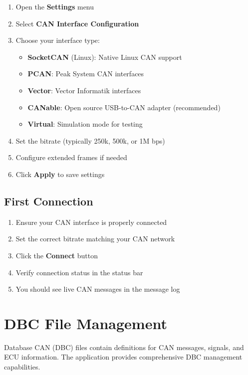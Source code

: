 \documentclass[11pt,a4paper]{article}
\begin{document}
\begin{enumerate}
    \item Open the \textbf{Settings} menu
    \item Select \textbf{CAN Interface Configuration}
    \item Choose your interface type:
    \begin{itemize}
        \item \textbf{SocketCAN} (Linux): Native Linux CAN support
        \item \textbf{PCAN}: Peak System CAN interfaces
        \item \textbf{Vector}: Vector Informatik interfaces
        \item \textbf{CANable}: Open source USB-to-CAN adapter (recommended)
        \item \textbf{Virtual}: Simulation mode for testing
    \end{itemize}
    \item Set the bitrate (typically 250k, 500k, or 1M bps)
    \item Configure extended frames if needed
    \item Click \textbf{Apply} to save settings
\end{enumerate}

\subsection{First Connection}

\begin{enumerate}
    \item Ensure your CAN interface is properly connected
    \item Set the correct bitrate matching your CAN network
    \item Click the \textcolor{cangreen}{} \textbf{Connect} button
    \item Verify connection status in the status bar
    \item You should see live CAN messages in the message log
\end{enumerate}

\section{DBC File Management}

Database CAN (DBC) files contain definitions for CAN messages, signals, and ECU information. The application provides comprehensive DBC management capabilities.
\end{document}
